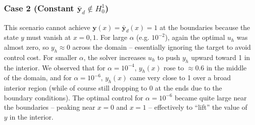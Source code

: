 \subsubsection*{Case 2 (Constant $\bar{\mathbf{y}}_d\notin H^1_0$)}
This scenario cannot achieve $\mathbf{y}(x)=\bar{\mathbf{y}}_d(x)=1$ at the boundaries because the state $y$ must vanish at $x=0,1$. For large $\alpha$ (e.g. $10^{-2}$), again the optimal $u_h$ was almost zero, so $y_h\approx 0$ across the domain -- essentially ignoring the target to avoid control cost. For smaller $\alpha$, the solver increases $u_h$ to push $y_h$ upward toward 1 in the interior. We observed that for $\alpha=10^{-4}$, $y_h(x)$ rose to $\approx 0.6$ in the middle of the domain, and for $\alpha=10^{-6}$, $y_h(x)$ came very close to 1 over a broad interior region (while of course still dropping to 0 at the ends due to the boundary conditions). The optimal control for $\alpha=10^{-6}$ became quite large near the boundaries -- peaking near $x=0$ and $x=1$ -- effectively to ``lift'' the value of $y$ in the interior.

